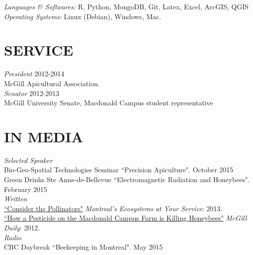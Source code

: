 \documentclass[margin, 10pt]{res} %
\begin{document}
\begin{resume}
{\sl Languages \& Softwares:} 
R, Python, MongoDB, Git, Latex, Excel, ArcGIS, QGIS \\
{\sl Operating Systems:} Linux (Debian), Windows, Mac. 

\section{SERVICE}
{\textit{President}} 2012-2014 \\ McGill Apicultural Association.  \\
{\sl Senator} 2012-2013 \\ McGill University Senate, Macdonald Campus student representative 

\section{IN MEDIA} 

{\sl Selected Speaker} \\

Bio-Geo-Spatial Technologies Seminar  ``Precision Apiculture". October 2015 \\
Green Drinks Ste Anne-de-Bellevue ``Electromagnetic Radiation and Honeybees". February 2015 \\
{\sl Written} \\  
\href{http://www.esmontreal.ca/index.php/component/k2/item/32-consider-the-pollinators/32-consider-the-pollinators}{``Consider the Pollinators"} {\sl Montreal's Ecosystems at Your Service}: 2013.\\
\href{http://www.mcgilldaily.com/2012/09/beeware/}{``How a Pesticide on the Macdonald Campus Farm is Killing Honeybees"} {\sl McGill Daily}: 2012.\\
{\sl Radio} \\ 
CBC Daybreak ``Beekeeping in Montreal". May 2015 


\end{resume}
\end{document}
